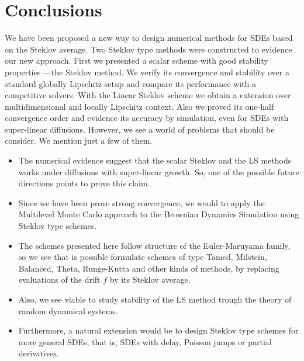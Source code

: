\section{Conclusions}
	We have been proposed a new way  to design numerical methods for SDEs based on the Steklov average.
Two Steklov type methods were constructed to evidence our new approach.
First we presented a scalar scheme with good stability properties ---the Steklov method.
We verify its convergence and stability over a standard globally Lipschitz setup and compare its performance with a 
competitive solvers.
%
With the Linear Steklov scheme we obtain a extension over multidimensional and locally Lipschitz 
context. Also we proved its one-half convergence order and evidence its accuracy by simulation, even for 
SDEs with super-linear diffusions. However, we see a world of problems that should be consider. We mention  just
a few of them.

\begin{itemize}
	\item
		The numerical evidence suggest that the scalar Steklov and the LS methods works under diffusions with 
		super-linear growth. So, one of the possible future directions points to prove this claim. 
	\item
		Since we have been prove strong convergence, we would to apply the Multilevel Monte Carlo approach to
		the Brownian Dynamics Simulation using Steklov type schemes.		

	\item
		The schemes presented here follow structure of the 
		Euler-Maruyama family, so we see that is possible formulate schemes of type Tamed, Milstein, Balanced, Theta, 
		Runge-Kutta  and other kinds of methods, by replacing evaluations of the drift $f$ by its Steklov average.
	\item	
		Also, we see viable to study stability of the LS method trough the theory of random dynamical systems.
	\item
		Furthermore, a natural extension would be to design Steklov type schemes for more general SDEs, that is, SDEs 
		with delay, Poisson jumps or partial derivatives. 	
\end{itemize}


%

 
 
